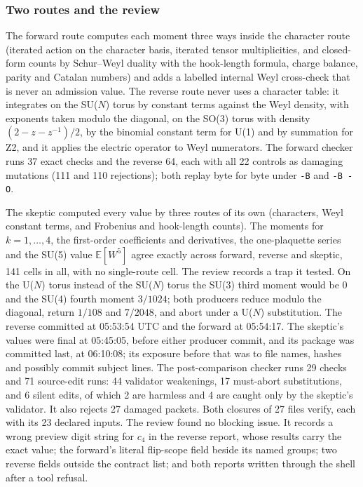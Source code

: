 \subsubsection{Two routes and the review}
\label{sec:bd1-review}
The forward route computes each moment three ways inside the character route
(iterated action on the character basis, iterated tensor multiplicities, and
closed-form counts by Schur--Weyl duality with the hook-length formula,
charge balance, parity and Catalan numbers) and adds a labelled internal Weyl
cross-check that is never an admission value. The reverse route never uses a
character table: it integrates on the SU($N$) torus by constant terms
against the Weyl density, with exponents taken modulo the diagonal, on the
SO(3) torus with density $(2-z-z^{-1})/2$, by the binomial constant term for
U(1) and by summation for Z2, and it applies the electric operator to Weyl
numerators. The forward checker runs 37 exact checks and the reverse 64,
each with all 22 controls as damaging mutations (111 and 110 rejections);
both replay byte for byte under \texttt{-B} and \texttt{-B -O}.

The skeptic computed every value by three routes of its own (characters,
Weyl constant terms, and Frobenius and hook-length counts). The moments for
$k=1,\ldots,4$, the first-order coefficients and derivatives, the
one-plaquette series and the SU(5) value $\mathbb E[W^5]$ agree exactly across
forward, reverse and skeptic, 141 cells in all, with no single-route cell.
The review records a trap it tested. On the U($N$) torus instead of the
SU($N$) torus the SU(3) third moment would be 0 and the SU(4) fourth moment
$3/1024$; both producers reduce modulo the diagonal, return $1/108$ and
$7/2048$, and abort under a U($N$) substitution. The reverse committed at
05:53:54 UTC and the forward at 05:54:17. The skeptic's values were final at
05:45:05, before either producer commit, and its package was committed last,
at 06:10:08; its exposure before that was to file names, hashes and possibly
commit subject lines. The post-comparison checker runs 29 checks and 71
source-edit runs: 44 validator weakenings, 17 must-abort substitutions, and 6
silent edits, of which 2 are harmless and 4 are caught only by the skeptic's
validator. It also rejects 27 damaged packets. Both closures of 27 files
verify, each with its 23 declared inputs. The review found no blocking issue.
It records a wrong preview digit string for $c_4$ in the reverse report,
whose results carry the exact value; the forward's literal flip-scope field
beside its named groups; two reverse fields outside the contract list; and
both reports written through the shell after a tool refusal.

